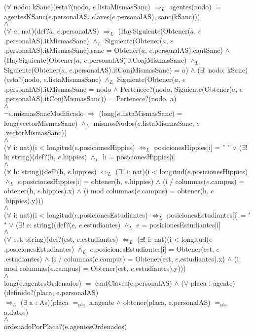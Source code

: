 	($\forall$ nodo: kSanc)(esta?(nodo, $e$.listaMismasSanc) $\Rightarrow_L$ agentes(nodo) $=$ agentesKSanc($e$.personalAS, claves($e$.personalAS), sanc(kSanc)))
	\\
	$\land$
	\\%
	($\forall$ $a$: nat)(def?$a$, $e$.personalAS) $\Rightarrow_L$ (HaySiguiente(Obtener($a$, $e$.personalAS).itMismasSanc) $\land_L$ Siguiente(Obtener($a$, $e$.personalAS).itMismasSanc).sanc = Obtener($a$, $e$.personalAS).cantSanc) $\land$ (HaySiguiente(Obtener($a$, $e$.personalAS).itConjMismasSanc) $\land_L$ Siguiente(Obtener($a$, $e$.personalAS).itConjMismasSanc) = $a$) $\land$ ($\exists!$ nodo: kSanc) (esta?(nodo, $e$.listaMismasSanc) $\land_L$ Siguiente(Obtener($a$, $e$.personalAS).itMismasSanc = nodo $\land$ Pertenece?(nodo,	Siguiente(Obtener($a$, $e$.personalAS).itConjMismasSanc)) = Pertenece?(nodo, a)
	\\
	$\land$
	\\%
	$\neg$$e$.mismasSancModificado $\Rightarrow$ (long($e$.listaMismasSanc) = long(vectorMismasSanc) $\land_L$ mismosNodos($e$.listaMismasSanc, $e$.vectorMismasSanc))
	\\
	$\land$
	\\%
	($\forall$ i: nat)(i < longitud($e$.posicionesHippies) $\Leftrightarrow_L$ posicionesHippies[i] = " " $\lor$ ($\exists!$ h: string)(def?(h, $e$.hippies) $\land_L$ h = posicionesHippies[i]
	\\
	$\land$
	\\%
	($\forall$ h: string)(def?(h, $e$.hippies) $\Leftrightarrow_L$ ($\exists!$ i: nat)(i < longitud($e$.posicionesHippies) $\land_L$ $e$.posicionesHippies[i] = obtener(h, $e$.hippies) $\land$ (i / columnas($e$.campus) = obtener(h, $e$.hippies).x) $\land$ (i mod columnas($e$.campus) = obtener(h, $e$.hippies).y)))
	\\
	$\land$
	\\%
	($\forall$ i: nat)(i < longitud($e$.posicionesEstudiantes) $\Leftrightarrow_L$ posicionesEstudiantes[i] = " " $\lor$ ($\exists!$ e: string)(def?(e, $e$.estudiantes) $\land_L$ e = posicionesEstudiantes[i]
	\\
	$\land$
	\\%
	($\forall$ est: string)(def?(est, $e$.estudiantes) $\Leftrightarrow_L$ ($\exists!$ i: nat)(i < longitud($e$.posicionesEstudiantes) $\land_L$ $e$.posicionesEstudiantes[i] = Obtener(est, $e$.estudiantes) $\land$ (i / columnas($e$.campus) = Obtener(est, $e$.estudiantes).x) $\land$ (i mod columnas($e$.campus) = Obtener(est, $e$.estudiantes).y)))
	\\
	$\land$
	\\%
	long(e.agentesOrdenados) $=$ cantClaves(e.personalAS) $\land$ ($\forall$ placa : agente)(definido?(placa, e.personalAS)
	\\$\Rightarrow_L$ ($\exists$ a : As)(placa $=_{obs}$ a.agente $\land$ obtener(placa, e.personalAS) $=_{obs}$ a.datos)
	\\
	$\land$
	\\%
	ordenadoPorPlaca?(e.agentesOrdenados)
	\\
	\\

